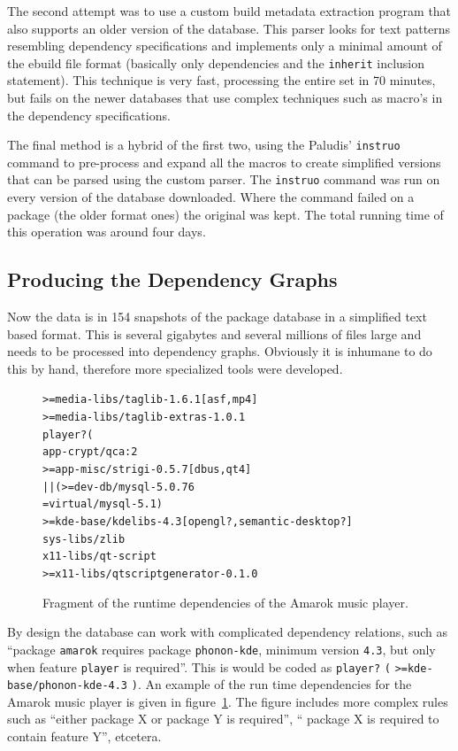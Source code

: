 \documentclass[smallextended,final]{svjour3}
\begin{document}
The second attempt was to use a custom build metadata extraction program that also supports an older version of the database. This parser looks for text patterns resembling dependency specifications and implements only a minimal amount of the ebuild file format (basically only dependencies and the \verb|inherit| inclusion statement). This technique is very fast, processing the entire set in 70 minutes, but fails on the newer databases that use complex techniques such as macro's in the dependency specifications.

The final method is a hybrid of the first two, using the Paludis' \verb|instruo| command to pre-process and expand all the macros to create simplified versions that can be parsed using the custom parser. The \verb|instruo| command was run on every version of the database downloaded. Where the command failed on a package (the older format ones) the original was kept. The total running time of this operation was around four days.

\subsection{Producing the Dependency Graphs}

Now the data is in 154 snapshots of the package database in a simplified text based format. This is several gigabytes and several millions of files large and needs to be processed into dependency graphs. Obviously it is inhumane to do this by hand, therefore more specialized tools were developed.

\begin{figure}[t]
\begin{alltt}
>=media-libs/taglib-1.6.1[asf,mp4]
>=media-libs/taglib-extras-1.0.1
player? (
    app-crypt/qca:2
    >=app-misc/strigi-0.5.7[dbus,qt4]
    || ( >=dev-db/mysql-5.0.76
         =virtual/mysql-5.1 )
    >=kde-base/kdelibs-4.3[opengl?,semantic-desktop?]
    sys-libs/zlib
    x11-libs/qt-script
    >=x11-libs/qtscriptgenerator-0.1.0
\end{alltt}
\vspace{-1em}
\caption{Fragment of the runtime dependencies of the Amarok music player.}\label{fig:amarokruntime}
\vspace{-2em}
\end{figure}

By design the database can work with complicated dependency relations, such as ``package \verb|amarok| requires package \verb|phonon-kde|, minimum version \verb|4.3|, but only when feature \verb|player| is required''. This is would be coded as \verb|player?| \verb|(| \verb|>=kde-base/phonon-kde-4.3| \verb|)|. An example of the run time dependencies for the Amarok music player is given in figure~\ref{fig:amarokruntime}. The figure includes more complex rules such as ``either package X or package Y is required'', `` package X is required to contain feature Y'', etcetera.
\end{document}

